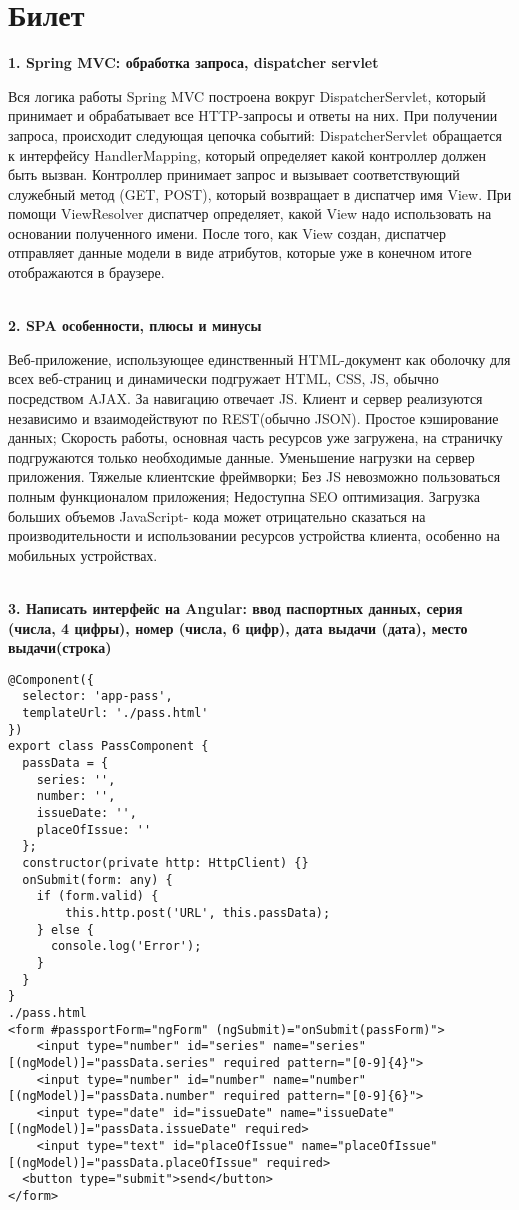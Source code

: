 \documentclass{article}
\newcommand{\bil}[5]{%
        \section{Билет}
        \textbf{1. #1}

        #4
        \\
        \textbf{2. #2}
        
        #5
        \\
        \textbf{3. #3}
}
\begin{document}
\bil{Spring MVC: обработка запроса, dispatcher servlet}{SPA особенности, плюсы и минусы}
{Написать интерфейс на Angular: ввод паспортных данных, серия (числа, 4 цифры), номер (числа, 6 цифр), дата выдачи (дата), место выдачи(строка)}{
    Вся логика работы Spring MVC построена вокруг DispatcherServlet, который принимает и обрабатывает все HTTP-запросы и ответы на них. 
    При получении запроса, происходит следующая цепочка событий: DispatcherServlet обращается к интерфейсу HandlerMapping, который определяет какой контроллер должен быть вызван. 
    Контроллер принимает запрос и вызывает соответствующий служебный метод (GET, POST), который возвращает в диспатчер имя View. 
    При помощи ViewResolver диспатчер определяет, какой View надо использовать на основании полученного имени. 
    После того, как View создан, диспатчер отправляет данные модели в виде атрибутов, которые уже в конечном итоге отображаются в браузере. 
}{
    Веб-приложение, использующее единственный HTML-документ как оболочку для всех веб-страниц и динамически подгружает HTML, CSS, JS, обычно посредством AJAX. 
    За навигацию отвечает JS. Клиент и сервер реализуются независимо и взаимодействуют по REST(обычно JSON).
    Простое кэширование данных; Скорость работы, основная часть ресурсов уже загружена, на страничку подгружаются только необходимые данные.
    Уменьшение нагрузки на сервер приложения. 
    Тяжелые клиентские фреймворки; Без JS невозможно пользоваться полным функционалом приложения; Недоступна SEO оптимизация. 
    Загрузка больших объемов JavaScript- кода может отрицательно сказаться на производительности и использовании ресурсов устройства клиента, особенно на мобильных устройствах.
}
\begin{lstlisting}[frame=single, basicstyle=\ttfamily, breaklines=true, breakatwhitespace=true, postbreak=\mbox{\textcolor{red}{$\hookrightarrow$}\space}]
@Component({
  selector: 'app-pass',
  templateUrl: './pass.html'
})
export class PassComponent {
  passData = {
    series: '',
    number: '',
    issueDate: '',
    placeOfIssue: ''
  };
  constructor(private http: HttpClient) {}
  onSubmit(form: any) {
    if (form.valid) {
        this.http.post('URL', this.passData);
    } else {
      console.log('Error');
    }
  }
}
./pass.html
<form #passportForm="ngForm" (ngSubmit)="onSubmit(passForm)">
    <input type="number" id="series" name="series"[(ngModel)]="passData.series" required pattern="[0-9]{4}">
    <input type="number" id="number" name="number" [(ngModel)]="passData.number" required pattern="[0-9]{6}">
    <input type="date" id="issueDate" name="issueDate" [(ngModel)]="passData.issueDate" required>
    <input type="text" id="placeOfIssue" name="placeOfIssue" [(ngModel)]="passData.placeOfIssue" required>
  <button type="submit">send</button>
</form>
\end{lstlisting}
\end{document}
